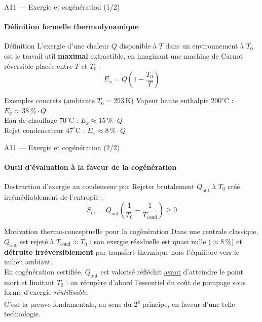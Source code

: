 \documentclass[aspectratio=43, 10pt]{beamer}
\newcommand{\Qout}{Q_{\text{out}}}
\begin{document}
\begin{frame}{A11 --- Exergie et cog\'en\'eration (1/2)}
  \framesubtitle{D\'efinition formelle thermodynamique}

  \begin{block}{D\'efinition}
    \normalsize
    L'exergie d'une chaleur $Q$ disponible \`a $T$
    dans un environnement \`a $T_0$ est le travail util
    \textbf{maximal} extractible, en imaginant une machine de Carnot r\'eversible plac\'ee entre $T$ et $T_0$ :
    \[
      E_x = Q\!\left(1 - \frac{T_0}{T}\right)
    \]
  \end{block}

  \vspace{1em}
  \begin{exampleblock}{Exemples concrets (ambiante $T_0 = 293$\,K)}
    \normalsize
    Vapeur haute enthalpie $200^\circ\mathrm{C}$ : $E_x \approx 38\,\%\cdot Q$\\
    Eau de chauffage $70^\circ\mathrm{C}$ : $E_x \approx 15\,\%\cdot Q$\\
    Rejet condensateur $47^\circ\mathrm{C}$ : $E_x \approx 8\,\%\cdot Q$
  \end{exampleblock}
\end{frame}

\begin{frame}{A11 --- Exergie et cog\'en\'eration (2/2)}
  \framesubtitle{Outil d'\'evaluation \`a la faveur de la cog\'en\'eration}
  
  \begin{block}{Destruction d'exergie au condenseur pur}
    \normalsize
    Rejeter brutalement $\Qout$ \`a $T_0$ cr\'e\'e irr\'em\'ediablement de l'entropie :
    \[
      \dot S_\text{irr} = \Qout\!\left(\frac{1}{T_0} - \frac{1}{T_\text{cond}}\right) \geq 0
    \]
  \end{block}

  \vspace{0.5em}
  \begin{alertblock}{Motivation thermo-conceptuelle pour la cog\'en\'eration}
    \normalsize
    Dans une centrale classique,
    $\Qout$ est rejet\'e \`a $T_\text{cond} \approx T_0$ :
    son exergie r\'esiduelle est quasi nulle ($\approx 8\,\%$)
    et \textbf{d\'etruite irr\'eversiblement} par transfert thermique hors l'\'equilibre vers le milieu ambiant.\\[6pt]
    En cog\'en\'eration certifi\'ee, $\Qout$ est valoris\'e r\'efl\'echit
    \underline{avant} d'atteindre le point mort et limitant $T_0$ :
    on r\'ecup\`ere d'abord l'essentiel du co\^ut de pompage sous forme d'exergie \textit{r\'eutilisable}.\\[6pt]
    C'est la preuve fondamentale, au sens du 2\textsuperscript{e} principe,
    en faveur d'une telle technologie.
  \end{alertblock}
\end{frame}
\end{document}
